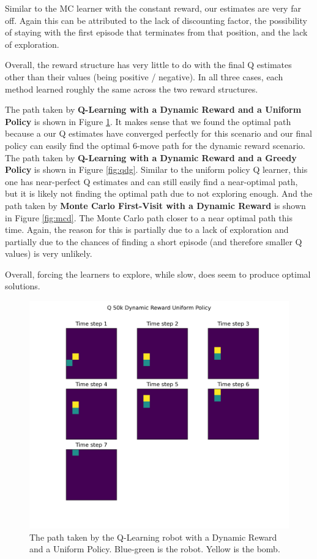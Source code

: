 \documentclass[12pt]{article}
\begin{document}
Similar to the MC learner with the constant reward, our estimates are very far off. Again this can be attributed to the lack of discounting factor, the possibility of staying with the first episode that terminates from that position, and the lack of exploration.


Overall, the reward structure has very little to do with the final Q estimates other than their values (being positive / negative). In all three cases, each method learned roughly the same across the two reward structures.

The path taken by \textbf{Q-Learning with a Dynamic Reward and a Uniform Policy} is shown in Figure \ref{fig:qdu}. It makes sense that we found the optimal path because a our Q estimates have converged perfectly for this scenario and our final policy can easily find the optimal 6-move path for the dynamic reward scenario. The path taken by \textbf{Q-Learning with a Dynamic Reward and a Greedy Policy} is shown in Figure \ref{fig:qdg}. Similar to the uniform policy Q learner, this one has near-perfect Q estimates and can still easily find a near-optimal path, but it is likely not finding the optimal path due to not exploring enough. And the path taken by \textbf{Monte Carlo First-Visit with a Dynamic Reward} is shown in Figure \ref{fig:mcd}. The Monte Carlo path closer to a near optimal path this time. Again, the reason for this is partially due to a lack of exploration and partially due to the chances of finding a short episode (and therefore smaller Q values) is very unlikely.

Overall, forcing the learners to explore, while slow, does seem to produce optimal solutions.

\begin{figure}
  \includegraphics[width=0.95\linewidth]{Figures/q-50k-dynamic-reward-uniform-policy.png}
  \centering
  \caption{The path taken by the Q-Learning robot with a Dynamic Reward and a Uniform Policy. Blue-green is the robot. Yellow is the bomb.}
  \label{fig:qdu}
\end{figure}
\end{document}
